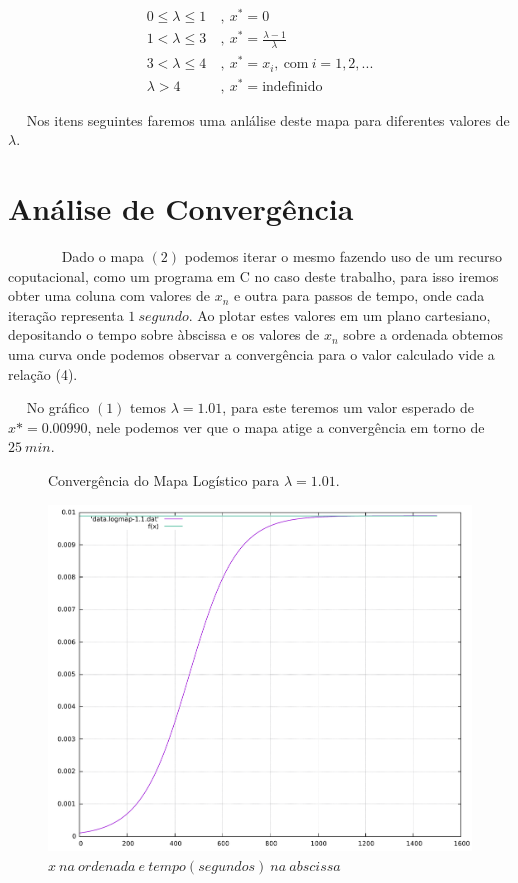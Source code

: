 \documentclass[pdftex,12pt,a4paper]{article}
\begin{document}
\begin{align}
0\leq \lambda \leq 1&\ ,\ x^* = 0\label{eq:0-1}\\
1< \lambda \leq 3&\ ,\ x^* = \frac{\lambda-1}{\lambda}\label{eq:1-3}\\
3< \lambda \leq 4&\ ,\ x^* = x_i,\ \text{com}\ i=1,2,...\label{eq:3-4}\\
\lambda>4&\ ,\ x^*=\text{indefinido}\label{eq:4-inf}
\end{align}

~~ Nos itens seguintes faremos uma anlálise deste mapa para diferentes valores de $\lambda$.
\section{Análise de Convergência}
~~~~~~~ Dado o mapa $(2)$ podemos iterar o mesmo fazendo uso de um recurso coputacional, como um programa em C no caso deste trabalho, para isso iremos obter uma coluna com valores de $x_{n}$ e outra para passos de tempo, onde cada iteração representa $1\ segundo $. Ao plotar estes valores em um plano cartesiano, depositando o tempo sobre àbscissa e os valores de $x_{n}$ sobre a ordenada obtemos uma curva onde podemos observar a convergência para o valor calculado vide a relação (4).\

~~ No gráfico $(1)$ temos $\lambda = 1.01$, para este teremos um valor esperado de $x* = 0.00990$, nele podemos ver que o mapa atige a convergência em torno de $25\ min$. 
\pagebreak
\newpage

\begin{figure}
\centering
\caption{Convergência do Mapa Logístico para $\lambda = 1.01$.}
\includegraphics[scale=0.5]{01}
\caption*{{\scriptsize $x\ na\ ordenada\ e\ tempo(segundos)\ na\ abscissa$ }}
\end{figure}
\end{document}

